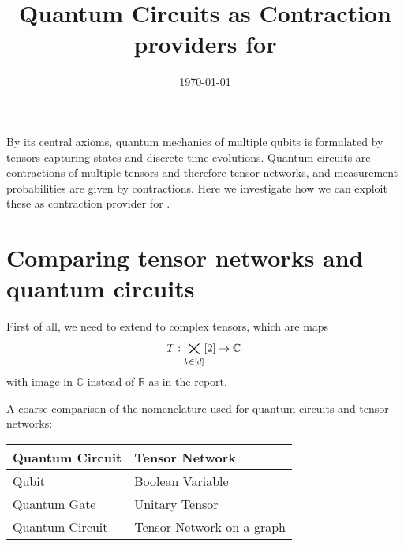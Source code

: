 \documentclass[aps,onecolumn,nofootinbib,pra]{article}
\begin{document}
    \title{Quantum Circuits as Contraction providers for \tnreason}

    \maketitle
    \date{\today}

    By its central axioms, quantum mechanics of multiple qubits is formulated by tensors capturing states and discrete time evolutions.
    Quantum circuits are contractions of multiple tensors and therefore tensor networks, and measurement probabilities are given by contractions.
    Here we investigate how we can exploit these as contraction provider for \tnreason.

    \section{Comparing tensor networks and quantum circuits}

    First of all, we need to extend to complex tensors, which are maps
    \begin{align*}
        T : \bigtimes_{k\in[d]}[2] \rightarrow \mathbb{C} \,
    \end{align*}
    with image in $\mathbb{C}$ instead of $\mathbb{R}$ as in the report.

    A coarse comparison of the nomenclature used for quantum circuits and tensor networks:

    \begin{center}
    \begin{tabular}{l|l}
        \textbf{Quantum Circuit} & \textbf{Tensor Network}\\
        \hline
        Qubit & Boolean Variable \\
        Quantum Gate & Unitary Tensor \\
        Quantum Circuit & Tensor Network on a graph
    \end{tabular}
    \end{center}
\end{document}

